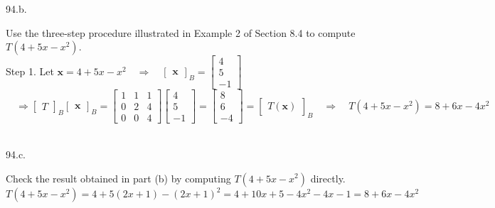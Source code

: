 \documentclass[12pt]{book}
\begin{document}
\begin{CJK}{UTF8}{bsmi}
94.b. \begin{minipage}[t]{\dimexpr\linewidth-2em}
Use the three-step procedure illustrated in Example 2 of Section 8.4 to compute $T(4+5x-x^2)$. \\
Step 1. Let $\textbf{x}=4+5x-x^2\quad\Rightarrow\quad\begin{bmatrix}
\textbf{x}
\end{bmatrix}_B=\begin{bmatrix}
4\\5\\-1
\end{bmatrix}$ \\
$\quad\Rightarrow\begin{bmatrix}
T
\end{bmatrix}_B\begin{bmatrix}
\textbf{x}
\end{bmatrix}_B=\begin{bmatrix}
1&1&1\\0&2&4\\0&0&4
\end{bmatrix}\begin{bmatrix}
4\\5\\-1
\end{bmatrix}=\begin{bmatrix}
8\\6\\-4
\end{bmatrix}=\begin{bmatrix}
T(\textbf{x})
\end{bmatrix}_B\quad\Rightarrow\quad T(4+5x-x^2)=8+6x-4x^2$
\end{minipage}\\

94.c. \begin{minipage}[t]{\dimexpr\linewidth-2em}
Check the result obtained in part (b) by computing $T(4+5x-x^2)$ directly. \\
$T(4+5x-x^2)=4+5(2x+1)-(2x+1)^2=4+10x+5-4x^2-4x-1=8+6x-4x^2$
\end{minipage}\\


\end{CJK}
\end{document}
